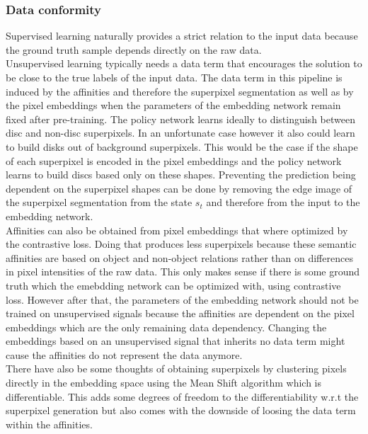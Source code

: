 \subsubsection{Data conformity}
Supervised learning naturally provides a strict relation to the input data because the ground truth sample depends directly on the raw data.\\
Unsupervised learning typically needs a data term that encourages the solution to be close to the true labels of the input data. The data term in this pipeline is induced by the affinities and therefore the superpixel segmentation as well as by the pixel embeddings when the parameters of the embedding network remain fixed after pre-training. The policy network learns ideally to distinguish between disc and non-disc superpixels. In an unfortunate case however it also could learn to build disks out of background superpixels. This would be the case if the shape of each superpixel is encoded in the pixel embeddings and the policy network learns to build discs based only on these shapes. Preventing the prediction being dependent on the superpixel shapes can be done by removing the edge image of the superpixel segmentation from the state $s_t$ and therefore from the input to the embedding network.\\
Affinities can also be obtained from pixel embeddings that where optimized by the contrastive loss. Doing that produces less superpixels because these semantic affinities are based on object and non-object relations rather than on differences in pixel intensities of the raw data. This only makes sense if there is some ground truth which the emebdding network can be optimized with, using contrastive loss. However after that, the parameters of the embedding network should not be trained on unsupervised signals because the affinities are dependent on the pixel embeddings which are the only remaining data dependency. Changing the embeddings based on an unsupervised signal that inherits no data term might cause the affinities do not represent the data anymore.\\
There have also be some thoughts of obtaining superpixels by clustering pixels directly in the embedding space using the Mean Shift algorithm \cite{400568} which is differentiable. This adds some degrees of freedom to the differentiability w.r.t the superpixel generation but also comes with the downside of loosing the data term within the affinities.\\



